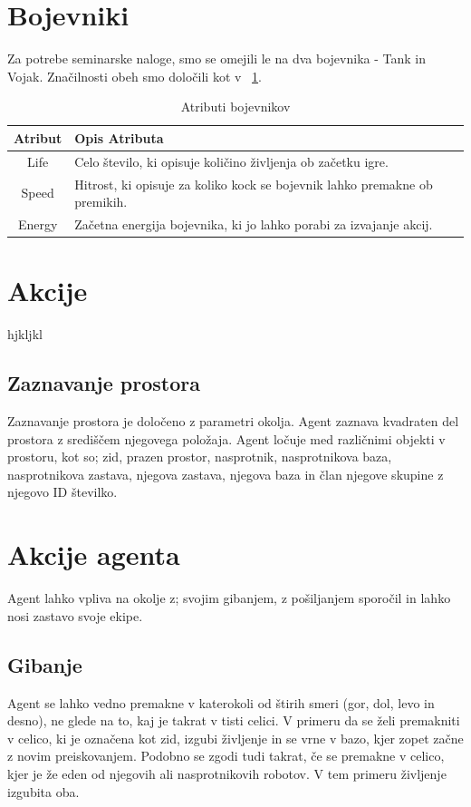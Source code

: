 \documentclass[12pt,a4paper,openany]{book}
\begin{document}
\section{Bojevniki}
Za potrebe seminarske naloge, smo se omejili le na dva bojevnika - Tank in Vojak. Značilnosti obeh smo določili kot v  ~\ref{table:bojevniki}.

\begin{table}[ht] \caption{Atributi bojevnikov}
\centering
\begin{tabular}{cp{10cm}}
\hline\hline
Atribut & Opis Atributa \\ [0.5ex]
\hline 
Life & Celo število, ki opisuje količino življenja ob začetku igre.\\
Speed & Hitrost, ki opisuje za koliko kock se bojevnik lahko premakne ob premikih.\\
Energy & Začetna energija bojevnika, ki jo lahko porabi za izvajanje akcij.\\ [1ex]
\hline %
\end{tabular}
\label{table:bojevniki} %
\end{table}


\section{Akcije}
hjkljkl


\subsection{Zaznavanje prostora}
Zaznavanje prostora je določeno z parametri okolja.  Agent zaznava kvadraten del prostora z središčem
njegovega položaja. Agent ločuje med različnimi objekti v prostoru, kot so; zid, prazen prostor, nasprotnik, nasprotnikova baza,
nasprotnikova zastava, njegova zastava, njegova baza in član njegove skupine z njegovo ID številko.


\section{Akcije agenta}
Agent lahko vpliva na okolje z; svojim gibanjem, z pošiljanjem sporočil in lahko nosi zastavo svoje ekipe.

\subsection{Gibanje}
Agent se lahko vedno premakne v katerokoli od štirih smeri (gor, dol, levo in desno), ne glede na to,
kaj je takrat v tisti celici. V primeru da se želi premakniti v celico, ki je označena kot zid, izgubi
življenje in se vrne v bazo, kjer zopet začne z novim preiskovanjem. Podobno se zgodi tudi takrat, če
se premakne v celico, kjer je že eden od njegovih ali nasprotnikovih robotov. V tem primeru življenje izgubita oba.
\end{document}
